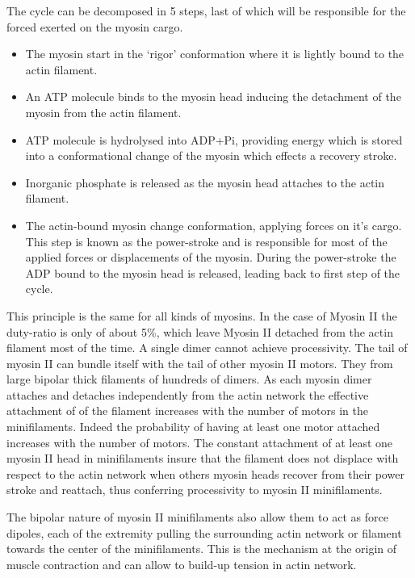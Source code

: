 \documentclass[A4paperpaper,11pt,english]{sphinxmanual}
\begin{document}
The cycle can be decomposed in 5 steps, last of which will be responsible for
the forced exerted on the myosin cargo.
\begin{itemize}
\item {} 
The myosin start in the `rigor' conformation where it is lightly bound to
the actin filament.

\item {} 
An ATP molecule binds to the myosin head inducing the detachment of the
myosin from the actin filament.

\item {} 
ATP molecule is hydrolysed into ADP+Pi, providing energy which is stored
into a conformational change of the myosin which effects a recovery
stroke.

\item {} 
Inorganic phosphate is released as the myosin head attaches to the actin
filament.

\item {} 
The actin-bound myosin change conformation, applying forces on it's
cargo. This step is known as the power-stroke and is responsible for most
of the applied forces or displacements of the myosin. During the
power-stroke the ADP bound to the myosin head is released, leading back
to first step of the cycle.

\end{itemize}

This principle is the same for all kinds of myosins. In the case of Myosin II
the duty-ratio is only of about 5\%, which leave Myosin II detached from the
actin filament most of the time. A single dimer cannot achieve
processivity.   The tail of myosin II can bundle itself with the tail of other
myosin II motors.  They from large bipolar thick filaments of hundreds of dimers.
As each myosin dimer attaches and detaches independently from the actin
network the effective attachment of of the filament increases with the number
of motors in the minifilaments. Indeed the probability of having at least one
motor attached increases with the number of motors. The constant attachment of
at least one myosin II head in minifilaments insure that the filament does not
displace with respect to the actin network when others myosin heads recover
from their power stroke and reattach, thus conferring processivity to myosin II
minifilaments.

The bipolar nature of myosin II minifilaments also allow them to act as force
dipoles, each  of the extremity pulling the surrounding actin network or
filament towards the center of the minifilaments. This is the mechanism at the
origin of muscle contraction and can allow to build-up tension in actin network.
\end{document}
